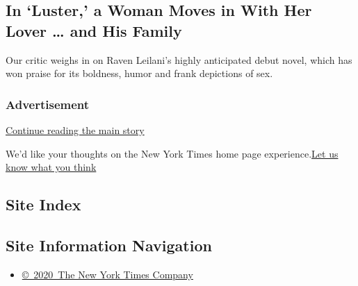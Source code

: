 \href{/2020/08/04/science/coronavirus-bayes-statistics-math.html}{}

\href{/2020/08/04/books/review-luster-raven-leilani.html}{}

\hypertarget{in-luster-a-woman-moves-in-with-her-lover--and-his-family}{%
\subsection{In `Luster,' a Woman Moves in With Her Lover \ldots{} and
His
Family}\label{in-luster-a-woman-moves-in-with-her-lover--and-his-family}}

Our critic weighs in on Raven Leilani's highly anticipated debut novel,
which has won praise for its boldness, humor and frank depictions of
sex.

\href{/2020/08/04/books/review-luster-raven-leilani.html}{}

\hypertarget{advertisement}{%
\subsubsection{Advertisement}\label{advertisement}}

\protect\hyperlink{after-dfp-ad-mid1-large}{Continue reading the main
story}

We'd like your thoughts on the New York Times home page
experience.\href{http://nyt.qualtrics.com/jfe/form/SV_eFJmKj9v0krSE0l}{Let
us know what you think}

\hypertarget{site-index}{%
\subsection{Site Index}\label{site-index}}

\hypertarget{site-information-navigation}{%
\subsection{Site Information
Navigation}\label{site-information-navigation}}

\begin{itemize}
\tightlist
\item
  \href{https://help.nytimes.com/hc/en-us/articles/115014792127-Copyright-notice}{©~2020~The
  New York Times Company}
\end{itemize}

